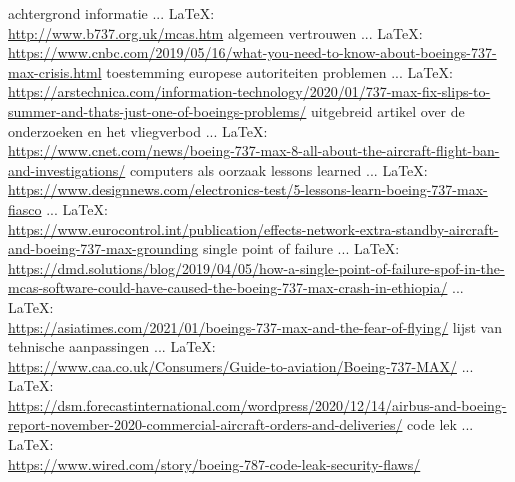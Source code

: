 {{achtergrond informatie
 ... \LaTeX:\\ \url{http://www.b737.org.uk/mcas.htm}
\cite{737mcas}
algemeen vertrouwen
 ... \LaTeX:\\ \url{https://www.cnbc.com/2019/05/16/what-you-need-to-know-about-boeings-737-max-crisis.html}
\cite{newburger17052019boeingcrisis}
toestemming europese autoriteiten
problemen
 ... \LaTeX:\\ \url{https://arstechnica.com/information-technology/2020/01/737-max-fix-slips-to-summer-and-thats-just-one-of-boeings-problems/}
\cite{arstechnica22012020737problems}
uitgebreid artikel over de onderzoeken en het vliegverbod
 ... \LaTeX:\\ \url{https://www.cnet.com/news/boeing-737-max-8-all-about-the-aircraft-flight-ban-and-investigations/}
\cite{german190620217372yaftergrounded}
computers als oorzaak
lessons learned
 ... \LaTeX:\\ \url{https://www.designnews.com/electronics-test/5-lessons-learn-boeing-737-max-fiasco}
\cite{beningo02052019boeinglessons}
 ... \LaTeX:\\ \url{https://www.eurocontrol.int/publication/effects-network-extra-standby-aircraft-and-boeing-737-max-grounding}
\cite{duran05042019boeingspof}
single point of failure
 ... \LaTeX:\\ \url{https://dmd.solutions/blog/2019/04/05/how-a-single-point-of-failure-spof-in-the-mcas-software-could-have-caused-the-boeing-737-max-crash-in-ethiopia/}
\cite{}
 ... \LaTeX:\\ \url{https://asiatimes.com/2021/01/boeings-737-max-and-the-fear-of-flying/}
\cite{makichuck24012021737fearflying}
lijst van tehnische aanpassingen
 ... \LaTeX:\\ \url{https://www.caa.co.uk/Consumers/Guide-to-aviation/Boeing-737-MAX/}
\cite{caa737modifications}
 ... \LaTeX:\\ \url{https://dsm.forecastinternational.com/wordpress/2020/12/14/airbus-and-boeing-report-november-2020-commercial-aircraft-orders-and-deliveries/}
\cite{oestergaard14122020boeingdeliveries}
code lek
 ... \LaTeX:\\ \url{https://www.wired.com/story/boeing-787-code-leak-security-flaws/}
}}
